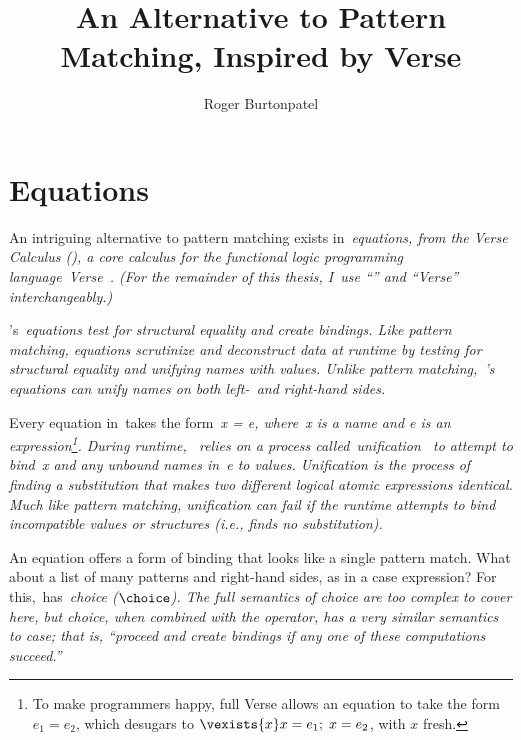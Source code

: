 \documentclass[manuscript,screen 12pt, nonacm]{acmart}
\title{An Alternative to Pattern Matching, Inspired by Verse}
\author{Roger Burtonpatel}
\affiliation{%
  \institution{Tufts University}
  \streetaddress{419 Boston Ave}
  \city{Medford}
  \state{Massachusetts}
  \country{USA}
  \postcode{02155}
}
\begin{document}
    
    \section{Equations}
    \label{verseoverobservers}

    An intriguing alternative to pattern matching exists in~\it{equations}, from
    the Verse Calculus (\VC), a core calculus for the functional logic
    programming language~\it{Verse}~\citep{antoy2010functional,
    hanus2013functional, verse}. (For the remainder of this thesis, I~use “\VC”
    and “Verse” interchangeably.)



    \VC's~\it{equations} test for structural equality and create bindings. Like
    pattern matching, equations scrutinize and deconstruct data at runtime by
    testing for structural equality and unifying names with values. Unlike
    pattern matching,~\VC's equations can unify names on both left-~\it{and}
    right-hand sides. 

    Every equation in~\VC takes the form~\it{x = e}, where~\it{x} is a name and
    \it{e} is an expression\footnote{To make programmers happy, full Verse
    allows an equation to take the form $e_{1} = e_{2}$, which desugars to
    $\vexists{x} x = e_{1};\; x = e_{2}$, with $x$ fresh.}. During runtime,~\VC
    relies on a process called~\it{unification}~\citep{robinson} to attempt to
    bind~\it{x} and any unbound names in~\it{e} to values. Unification is the
    process of finding a substitution that makes two different logical atomic
    expressions identical. Much like pattern matching, unification can fail if
    the runtime attempts to bind incompatible values or structures (i.e., finds
    no substitution). 

    An equation offers a form of binding that looks like a single pattern match.
    What about a list of many patterns and right-hand sides, as in a case
    expression? For this,~\VC has~\it{choice} ($\choice$). The full semantics of
    choice are too complex to cover here, but choice, when combined with the
    \one operator, has a very similar semantics to case; that is, “proceed
    and create bindings if any one of these computations succeed.” 
\end{document}
